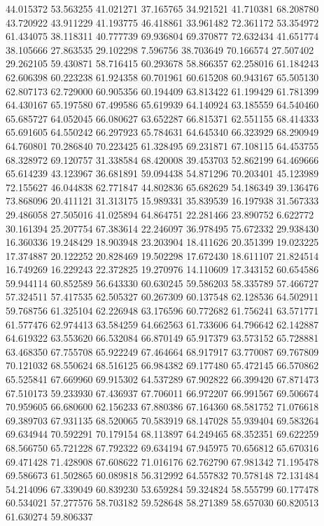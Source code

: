 44.015372
53.563255
41.021271
37.165765
34.921521
41.710381
68.208780
43.720922
43.911229
41.193775
46.418861
33.961482
72.361172
53.354972
61.434075
38.118311
40.777739
69.936804
69.370877
72.632434
41.651774
38.105666
27.863535
29.102298
7.596756
38.703649
70.166574
27.507402
29.262105
59.430871
58.716415
60.293678
58.866357
62.258016
61.184243
62.606398
60.223238
61.924358
60.701961
60.615208
60.943167
65.505130
62.807173
62.729000
60.905356
60.194409
63.813422
61.199429
61.781399
64.430167
65.197580
67.499586
65.619939
64.140924
63.185559
64.540460
65.685727
64.052045
66.080627
63.652287
66.815371
62.551155
68.414333
65.691605
64.550242
66.297923
65.784631
64.645340
66.323929
68.290949
64.760801
70.286840
70.223425
61.328495
69.231871
67.108115
64.453755
68.328972
69.120757
31.338584
68.420008
39.453703
52.862199
64.469666
65.614239
43.123967
36.681891
59.094438
54.871296
70.203401
45.123989
72.155627
46.044838
62.771847
44.802836
65.682629
54.186349
39.136476
73.868096
20.411121
31.313175
15.989331
35.839539
16.197938
31.567333
29.486058
27.505016
41.025894
64.864751
22.281466
23.890752
6.622772
30.161394
25.207754
67.383614
22.246097
36.978495
75.672332
29.938430
16.360336
19.248429
18.903948
23.203904
18.411626
20.351399
19.023225
17.374887
20.122252
20.828469
19.502298
17.672430
18.611107
21.824514
16.749269
16.229243
22.372825
19.270976
14.110609
17.343152
60.654586
59.944114
60.852589
56.643330
60.630245
59.586203
58.335789
57.466727
57.324511
57.417535
62.505327
60.267309
60.137548
62.128536
64.502911
59.768756
61.325104
62.226948
63.176596
60.772682
61.756241
63.571771
61.577476
62.974413
63.584259
64.662563
61.733606
64.796642
62.142887
64.619322
63.553620
66.532084
66.870149
65.917379
63.573152
65.728881
63.468350
67.755708
65.922249
67.464664
68.917917
63.770087
69.767809
70.121032
68.550624
68.516125
66.984382
69.177480
65.472145
66.570862
65.525841
67.669960
69.915302
64.537289
67.902822
66.399420
67.871473
67.510173
59.233930
67.436937
67.706011
66.972207
66.991567
69.506674
70.959605
66.680600
62.156233
67.880386
67.164360
68.581752
71.076618
69.389703
67.931135
68.520065
70.583919
68.147028
55.939404
69.583264
69.634944
70.592291
70.179154
68.113897
64.249465
68.352351
69.622259
68.566750
65.721228
67.792322
69.634194
67.945975
70.656812
65.670316
69.471428
71.428908
67.608622
71.016176
62.762790
67.981342
71.195478
69.586673
61.502865
60.089818
56.312992
64.557832
70.578148
72.131484
54.214096
67.339049
60.839230
53.659284
59.324824
58.555799
60.177478
60.534021
57.277576
58.703182
59.528648
58.271389
58.657030
60.820513
61.630274
59.806337
